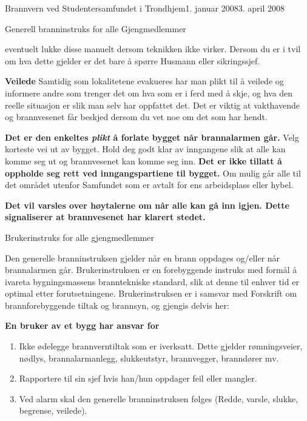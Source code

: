 \begin{instruks}{Brannvern ved Studentersamfundet i Trondhjem}{1. januar 2008}{3. april 2008}
\begin{instruksledd}{Generell branninstruks for alle Gjengmedlemmer}
\begin{description}
                eventuelt lukke disse manuelt dersom
                teknikken ikke virker. Dersom du er i tvil om hva dette gjelder er det bare å
                spørre Husmann eller sikringssjef.
            \item \textbf{Veilede} Samtidig som lokalitetene evakueres har man plikt til å veilede og
                informere andre som trenger det om hva som er i
                ferd med å skje, og hva den reelle situasjon er slik man selv har
                oppfattet det. Det er viktig at vakthavende og
                brannvesenet får beskjed dersom du vet noe om det som har hendt.
        \end{description}

        \textbf{Det er den enkeltes \emph{plikt} å forlate bygget når brannalarmen går.} Velg korteste vei
        ut av bygget. Hold deg godt klar av inngangene slik at alle kan komme seg ut og brannvesenet kan komme seg inn.
        \textbf{Det er ikke tillatt å oppholde seg rett ved inngangspartiene til bygget.} Om mulig går alle til det området utenfor
        Samfundet som er avtalt for ens arbeidsplass eller hybel.

        \textbf{Det vil varsles over høytalerne om når alle kan gå inn igjen. Dette signaliserer at
        brannvesenet har klarert stedet.}


    \end{instruksledd}



    \begin{instruksledd}{Brukerinstruks for alle gjengmedlemmer}


        Den generelle branninstruksen gjelder når en brann oppdages og/eller når
        brannalarmen går. Brukerinstruksen er en
        forebyggende instruks med formål å ivareta bygningsmassens branntekniske standard,
        slik at denne til enhver tid er
        optimal etter forutsetningene. Brukerinstruksen er i samsvar med Forskrift om
        brannforebyggende tiltak og brannsyn,
        og gjengis delvis her:


        \begin{center}
            \textbf{En bruker av et bygg har ansvar for}
        \end{center}


        \begin{enumerate}
            \item Ikke ødelegge brannverntiltak som er iverksatt. Dette gjelder rømningsveier, nødlys, brannalarmanlegg,
                slukkeutstyr, brannvegger, branndører mv.
            \item Rapportere til sin sjef hvis han/hun oppdager feil eller mangler.
            \item  Ved alarm skal den generelle branninstruksen følges (Redde, varsle,
                slukke, begrense, veilede).
        \end{enumerate}



\end{instruksledd}
\end{instruks}
